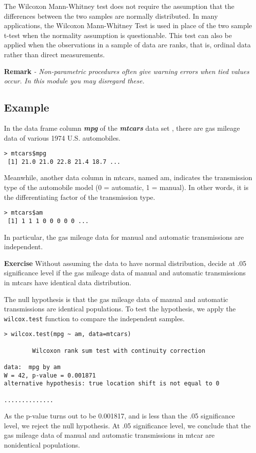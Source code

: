 \documentclass[a4paper,12pt]{article}
\begin{document}
The Wilcoxon Mann-Whitney test does not require the assumption that the differences between the two samples are normally distributed.
In many applications, the Wilcoxon Mann-Whitney Test is used in place of the two sample t-test when the normality assumption is questionable.
This test can also be applied when the observations in a sample of data are ranks, that is, ordinal data rather than direct measurements.

\noindent \textbf{Remark} \textit{- Non-parametric procedures often give warning errors when tied values occur. In this module you may disregard these.}

\bigskip

\subsection{Example}
In the data frame column \textit{\textbf{mpg}} of the \textit{\textbf{mtcars}} data set , there are gas mileage data of various 1974 U.S. automobiles.

\begin{verbatim}
> mtcars$mpg 
 [1] 21.0 21.0 22.8 21.4 18.7 ...
\end{verbatim} 
Meanwhile, another data column in mtcars, named am, indicates the transmission type of the automobile model (0 = automatic, 1 = manual). In other words, it is the differentiating factor of the transmission type.
\begin{verbatim}
> mtcars$am 
 [1] 1 1 1 0 0 0 0 0 ...
\end{verbatim} 
In particular, the gas mileage data for manual and automatic transmissions are independent.

\textbf{Exercise}
Without assuming the data to have normal distribution, decide at .05 significance level if the gas mileage data of manual and automatic transmissions in mtcars have identical data distribution.

The null hypothesis is that the gas mileage data of manual and automatic transmissions are identical populations. To test the hypothesis, we apply the \texttt{wilcox.test} function to compare the independent samples. 

\begin{verbatim}
> wilcox.test(mpg ~ am, data=mtcars) 
 
        Wilcoxon rank sum test with continuity correction 
 
data:  mpg by am 
W = 42, p-value = 0.001871 
alternative hypothesis: true location shift is not equal to 0 
 
..............
\end{verbatim}
As the p-value turns out to be 0.001817, and is less than the .05 significance level, we reject the null hypothesis.
At .05 significance level, we conclude that the gas mileage data of manual and automatic transmissions in mtcar are nonidentical populations.
\end{document}
